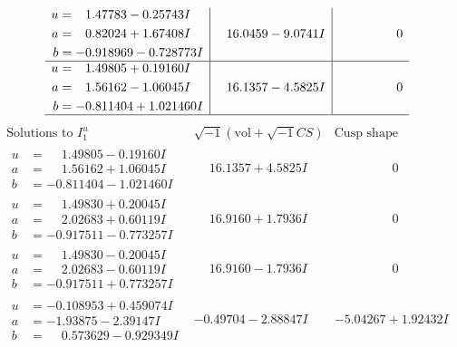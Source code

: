\documentclass[1p]{elsarticle_modified}
\theoremstyle{definition}
\newcommand{\I}{\sqrt{-1}}
\begin{document}
$$\begin{array}{c|c|c}
\begin{aligned}
u &= \phantom{-}1.47783 - 0.25743 I \\
a &= \phantom{-}0.82024 + 1.67408 I \\
b &= -0.918969 - 0.728773 I\end{aligned}
 & \phantom{-}16.0459 - 9.0741 I & \phantom{-0.000000 } 0 \\ \hline\begin{aligned}
u &= \phantom{-}1.49805 + 0.19160 I \\
a &= \phantom{-}1.56162 - 1.06045 I \\
b &= -0.811404 + 1.021460 I\end{aligned}
 & \phantom{-}16.1357 - 4.5825 I & \phantom{-0.000000 } 0\\
 \hline 
 \end{array}$$\newpage$$\begin{array}{c|c|c}  
\text{Solutions to }I^u_{1}& \I (\text{vol} + \sqrt{-1}CS) & \text{Cusp shape}\\
 \hline 
\begin{aligned}
u &= \phantom{-}1.49805 - 0.19160 I \\
a &= \phantom{-}1.56162 + 1.06045 I \\
b &= -0.811404 - 1.021460 I\end{aligned}
 & \phantom{-}16.1357 + 4.5825 I & \phantom{-0.000000 } 0 \\ \hline\begin{aligned}
u &= \phantom{-}1.49830 + 0.20045 I \\
a &= \phantom{-}2.02683 + 0.60119 I \\
b &= -0.917511 - 0.773257 I\end{aligned}
 & \phantom{-}16.9160 + 1.7936 I & \phantom{-0.000000 } 0 \\ \hline\begin{aligned}
u &= \phantom{-}1.49830 - 0.20045 I \\
a &= \phantom{-}2.02683 - 0.60119 I \\
b &= -0.917511 + 0.773257 I\end{aligned}
 & \phantom{-}16.9160 - 1.7936 I & \phantom{-0.000000 } 0 \\ \hline\begin{aligned}
u &= -0.108953 + 0.459074 I \\
a &= -1.93875 - 2.39147 I \\
b &= \phantom{-}0.573629 - 0.929349 I\end{aligned}
 & -0.49704 - 2.88847 I & -5.04267 + 1.92432 I \\ \hline\begin{aligned}

\end{aligned}
\end{array}$$
\end{document}
